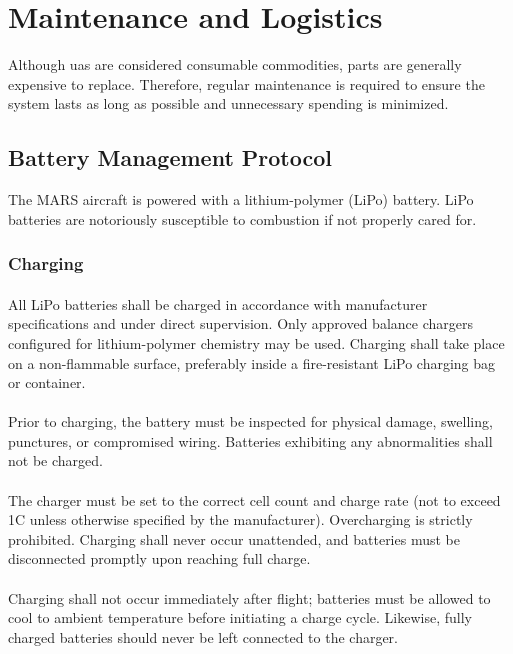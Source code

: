 \chapter{Maintenance and Logistics}
\label{ch:maintenance}

Although \ac{uas} are considered consumable commodities, parts are generally expensive to replace. Therefore, regular maintenance is required to ensure the system lasts as long as possible and unnecessary spending is minimized.

\section{Battery Management Protocol}\label{sec:batterymgmt}
    The MARS aircraft is powered with a lithium-polymer (LiPo) battery. LiPo batteries are notoriously susceptible to combustion if not properly cared for.
    \subsection{Charging}
    \subsubsection{} All LiPo batteries shall be charged in accordance with manufacturer specifications and under direct supervision. Only approved balance chargers configured for lithium-polymer chemistry may be used. Charging shall take place on a non-flammable surface, preferably inside a fire-resistant LiPo charging bag or container.
    
    \subsubsection{} Prior to charging, the battery must be inspected for physical damage, swelling, punctures, or compromised wiring. Batteries exhibiting any abnormalities shall not be charged.
    
    \subsubsection{} The charger must be set to the correct cell count and charge rate (not to exceed 1C unless otherwise specified by the manufacturer). Overcharging is strictly prohibited. Charging shall never occur unattended, and batteries must be disconnected promptly upon reaching full charge.
    
    \subsubsection{} Charging shall not occur immediately after flight; batteries must be allowed to cool to ambient temperature before initiating a charge cycle. Likewise, fully charged batteries should never be left connected to the charger.
    
